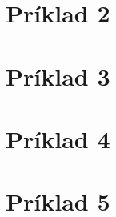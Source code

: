 \documentclass[paper=a4, fontsize=11pt]{scrartcl} %
\numberwithin{equation}{section} %
\numberwithin{figure}{section} %
\numberwithin{table}{section} %
\begin{document}
\pagebreak


\section*{Príklad 2}

\pagebreak


\section*{Príklad 3}

\pagebreak


\section*{Príklad 4}

\pagebreak


\section*{Príklad 5}
\end{document}
